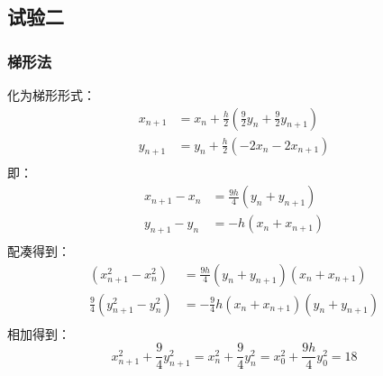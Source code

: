 \documentclass{article}
\begin{document}
\subsection{试验二}
\subsubsection{梯形法}
化为梯形形式：
\begin{equation*}
    \begin{aligned}
        x_{n+1}&=x_{n}+\frac{h}{2}\left(\frac{9}{2}y_{n}+\frac{9}{2}y_{n+1}\right)\\
        y_{n+1}&=y_{n}+\frac{h}{2}(-2x_{n}-2x_{n+1})\\
    \end{aligned}
\end{equation*}
即：
\begin{equation*}
    \begin{aligned}
        x_{n+1}-x_{n}&=\frac{9h}{4}(y_{n}+y_{n+1})\\
        y_{n+1}-y_{n}&=-h(x_{n}+x_{n+1})\\
    \end{aligned}
\end{equation*}
配凑得到：
\begin{equation*}
    \begin{aligned}
        (x_{n+1}^2-x_{n}^2)&=\frac{9h}{4}(y_{n}+y_{n+1})(x_{n}+x_{n+1})\\
        \frac{9}{4}(y_{n+1}^2-y_{n}^2)&=-\frac{9}{4}h(x_{n}+x_{n+1})(y_{n}+y_{n+1})\\
    \end{aligned}
\end{equation*}
相加得到：
\begin{equation*}
    x_{n+1}^2+\frac{9}{4}y_{n+1}^2=x_{n}^2+\frac{9}{4}y_{n}^2=x_{0}^2+\frac{9h}{4}y_{0}^2=18
\end{equation*}
\end{document}

